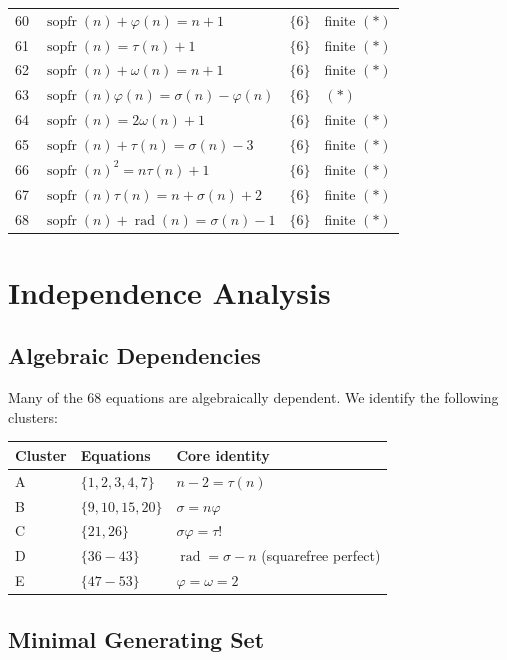 \documentclass{article}
\newcommand{\rad}{\operatorname{rad}}
\newcommand{\sopfr}{\operatorname{sopfr}}
\begin{document}
\begin{longtable}{rp{7.5cm}ll}
60 & $\sopfr(n) + \varphi(n) = n + 1$ & $\{6\}$ & finite $(*)$ \\
61 & $\sopfr(n) = \tau(n) + 1$ & $\{6\}$ & finite $(*)$ \\
62 & $\sopfr(n) + \omega(n) = n + 1$ & $\{6\}$ & finite $(*)$ \\
63 & $\sopfr(n)\varphi(n) = \sigma(n) - \varphi(n)$ & $\{6\}$ & $(*)$ \\
64 & $\sopfr(n) = 2\omega(n) + 1$ & $\{6\}$ & finite $(*)$ \\
65 & $\sopfr(n) + \tau(n) = \sigma(n) - 3$ & $\{6\}$ & finite $(*)$ \\
66 & $\sopfr(n)^2 = n\tau(n) + 1$ & $\{6\}$ & finite $(*)$ \\
67 & $\sopfr(n)\tau(n) = n + \sigma(n) + 2$ & $\{6\}$ & finite $(*)$ \\
68 & $\sopfr(n) + \rad(n) = \sigma(n) - 1$ & $\{6\}$ & finite $(*)$ \\
\end{longtable}

\section{Independence Analysis}

\subsection{Algebraic Dependencies}

Many of the 68 equations are algebraically dependent. We identify the following clusters:

\begin{center}
\begin{tabular}{lll}
\toprule
Cluster & Equations & Core identity \\
\midrule
A & $\{1, 2, 3, 4, 7\}$ & $n - 2 = \tau(n)$ \\
B & $\{9, 10, 15, 20\}$ & $\sigma = n\varphi$ \\
C & $\{21, 26\}$ & $\sigma\varphi = \tau!$ \\
D & $\{36{-}43\}$ & $\rad = \sigma - n$ (squarefree perfect) \\
E & $\{47{-}53\}$ & $\varphi = \omega = 2$ \\
\bottomrule
\end{tabular}
\end{center}

\subsection{Minimal Generating Set}
\end{document}
